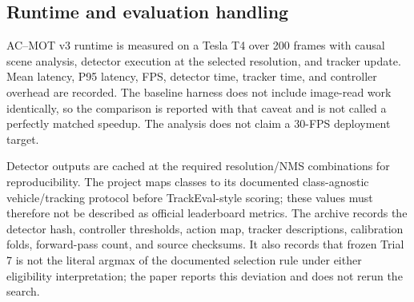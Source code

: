 \subsection{Runtime and evaluation handling}
AC--MOT v3 runtime is measured on a Tesla T4 over 200 frames with causal scene
analysis, detector execution at the selected resolution, and tracker update.
Mean latency, P95 latency, FPS, detector time, tracker time, and controller
overhead are recorded. The baseline harness does not include image-read work
identically, so the comparison is reported with that caveat and is not called a
perfectly matched speedup. The analysis does not claim a 30-FPS deployment
target.

Detector outputs are cached at the required resolution/NMS combinations for
reproducibility. The project maps classes to its documented class-agnostic
vehicle/tracking protocol before TrackEval-style scoring; these values must
therefore not be described as official leaderboard metrics. The archive records
the detector hash, controller thresholds, action map, tracker descriptions,
calibration folds, forward-pass count, and source checksums. It also records
that frozen Trial 7 is not the literal argmax of the documented selection rule
under either eligibility interpretation; the paper reports this deviation and
does not rerun the search.
